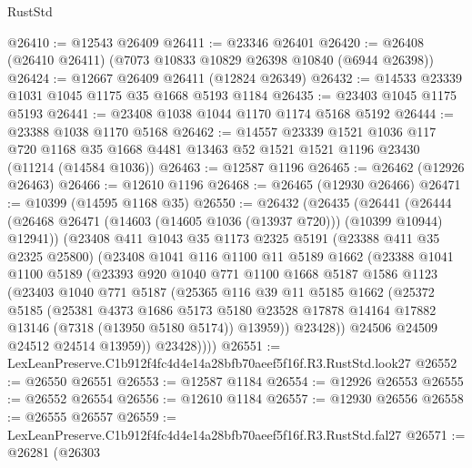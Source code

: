 \begin{lexlean}{RustStd}
\begin{coremodule}
@26410 := @12543 @26409
@26411 := @23346 @26401
@26420 := @26408 (@26410 @26411) (@7073 @10833 @10829 @26398 @10840 (@6944 @26398))
@26424 := @12667 @26409 @26411 (@12824 @26349)
@26432 := @14533 @23339 @1031 @1045 @1175 @35 @1668 @5193 @1184
@26435 := @23403 @1045 @1175 @5193
@26441 := @23408 @1038 @1044 @1170 @1174 @5168 @5192
@26444 := @23388 @1038 @1170 @5168
@26462 := @14557
    @23339
    @1521
    @1036
    @117
    @720
    @1168
    @35
    @1668
    @4481
    @13463
    @52
    @1521
    @1521
    @1196
    @23430
    (@11214 (@14584 @1036))
@26463 := @12587 @1196
@26465 := @26462 (@12926 @26463)
@26466 := @12610 @1196
@26468 := @26465 (@12930 @26466)
@26471 := @10399 (@14595 @1168 @35)
@26550 := @26432
    (@26435
      (@26441
        (@26444 (@26468 @26471 (@14603 (@14605 @1036 (@13937 @720))) (@10399 @10944) @12941))
        (@23408
          @411
          @1043
          @35
          @1173
          @2325
          @5191
          (@23388 @411 @35 @2325 @25800)
          (@23408
            @1041
            @116
            @1100
            @11
            @5189
            @1662
            (@23388
              @1041
              @1100
              @5189
              (@23393
                @920
                @1040
                @771
                @1100
                @1668
                @5187
                @1586
                @1123
                (@23403
                  @1040
                  @771
                  @5187
                  (@25365
                    @116
                    @39
                    @11
                    @5185
                    @1662
                    (@25372
                      @5185
                      (@25381
                        @4373
                        @1686
                        @5173
                        @5180
                        @23528
                        @17878
                        @14164
                        @17882
                        @13146
                        (@7318 (@13950 @5180 @5174))
                        @13959))
                    @23428))
                @24506
                @24509
                @24512
                @24514
                @13959))
            @23428))))
@26551 := LexLeanPreserve.C1b912f4fc4d4e14a28bfb70aeef5f16f.R3.RustStd.look27
@26552 := @26550 @26551
@26553 := @12587 @1184
@26554 := @12926 @26553
@26555 := @26552 @26554
@26556 := @12610 @1184
@26557 := @12930 @26556
@26558 := @26555 @26557
@26559 := LexLeanPreserve.C1b912f4fc4d4e14a28bfb70aeef5f16f.R3.RustStd.fal27
@26571 := @26281
    (@26303

\end{coremodule}
\end{lexlean}
